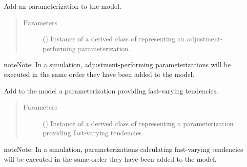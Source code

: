\documentclass[letterpaper,10pt,english]{sphinxmanual}
\begin{document}
\begin{fulllineitems}
\begin{fulllineitems}
\label{\detokenize{api:model.Model.add_adjustment_parameterization}}
Add an  parameterization to the model.
\begin{quote}\begin{description}
\item[{Parameters}] \leavevmode
{} () \textendash{} Instance of a derived class of 
representing an adjustment-performing parameterization.

\end{description}\end{quote}

\begin{sphinxadmonition}{note}{Note:}
In a simulation, adjustment-performing parameterizations will be executed in the same order
they have been added to the model.
\end{sphinxadmonition}

\end{fulllineitems}


\begin{fulllineitems}
\label{\detokenize{api:model.Model.add_fast_tendency_parameterization}}
Add to the model a parameterization providing fast-varying tendencies.
\begin{quote}\begin{description}
\item[{Parameters}] \leavevmode
{} () \textendash{} Instance of a derived class of 
representing a parameterization providing fast-varying tendencies.

\end{description}\end{quote}

\begin{sphinxadmonition}{note}{Note:}
In a simulation, parameterizations calculating fast-varying tendencies will be executed in the same
order they have been added to the model.
\end{sphinxadmonition}


\end{fulllineitems}
\end{fulllineitems}
\end{document}

